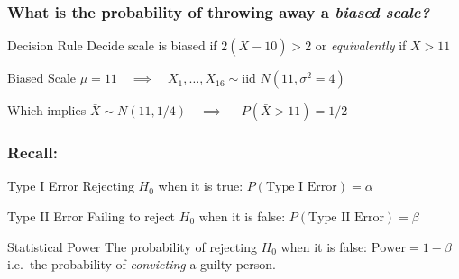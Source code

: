 \documentclass[handout]{beamer}
\begin{document}
\begin{frame}
	\frametitle{What is the probability of throwing away a \em{biased} scale?}

	\begin{block}
		{Decision Rule}
		Decide scale is biased if $2(\bar{X} - 10) > 2$ or \emph{equivalently} if \alert{$\bar{X} > 11$} 
	\end{block}
	\begin{block}
		{Biased Scale}
		$\mu = 11 \quad \implies \quad X_1, \hdots, X_{16} \sim \mbox{iid } N(11, \sigma^2 = 4)$
	\end{block}
	\begin{alertblock}
		{Which implies}
		$\bar{X} \sim N(11, 1/4)\quad \implies \quad$  \alert{$P(\bar{X}>11) = 1/2$} 
	\end{alertblock}

\vspace{1em}

	\alert{}
\end{frame}
\begin{frame}[c]\frametitle{Recall:}

\begin{block}
	{Type I Error} Rejecting $H_0$ when it is true:  $P(\mbox{Type I Error}) = \alpha$
\end{block}

\begin{block}
	{Type II Error} Failing to reject $H_0$ when it is false: \alert{$P(\mbox{Type II Error}) =\beta$}
\end{block}

\begin{alertblock}
	{Statistical Power} The probability of rejecting $H_0$ when it is false: \alert{$\mbox{Power} = 1 -\beta $}\\ i.e.\ the probability of \emph{convicting} a guilty person.
\end{alertblock}

\vspace{1em}

\begin{center}
\alert{}
\end{center}
\end{frame}
\end{document}
